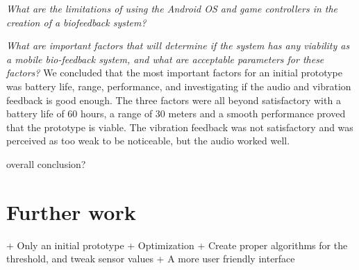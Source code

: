 \textit{What are the limitations of using the Android OS and game controllers in the creation of a biofeedback system?}

\textit{What are important factors that will determine if the system has any viability as a mobile bio-feedback system, and what are acceptable parameters for these factors?}
We concluded that the most important factors for an initial prototype was battery life, range, performance, and investigating if the audio and vibration feedback is good enough. The three factors were all beyond satisfactory with a battery life of 60 hours, a range of 30 meters and a smooth performance proved that the prototype is viable. The vibration feedback was not satisfactory and was perceived as too weak to be noticeable, but the audio worked well.

overall conclusion?

\section{Further work}
+ Only an initial prototype
+ Optimization
+ Create proper algorithms for the threshold, and tweak sensor values
+ A more user friendly interface
